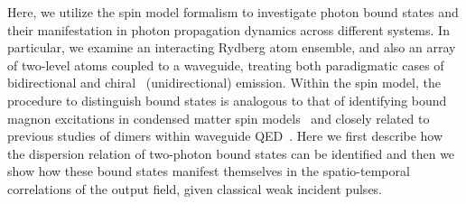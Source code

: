 \documentclass[pra,twocolumn,showpacs,preprintnumbers,amsmath,amssymb]{revtex4-1}
\begin{document}
Here, we utilize the spin model formalism to investigate photon bound states and their manifestation in photon propagation dynamics across different systems. In particular, we examine an interacting Rydberg atom ensemble, and also an array of two-level atoms coupled to a waveguide, treating both paradigmatic cases of bidirectional and chiral~\cite{Stannigel2012,Pichler2015,ChiralRev}  (unidirectional) emission. Within the spin model, the procedure to distinguish bound states  is analogous to that of identifying bound magnon excitations in condensed matter spin  models~\cite{Bethe,wortis,Schneider,Mattis,bloch,petroBS,cooper,ramos} and 
closely related to previous studies of dimers within waveguide QED~\cite{dimermolmer2,dimer_poddu,rev_wqedarray}. Here we first describe how the dispersion relation of two-photon bound states can be identified and then we show how these bound states manifest themselves in the spatio-temporal correlations of the output field, given classical weak incident pulses.
\end{document}
